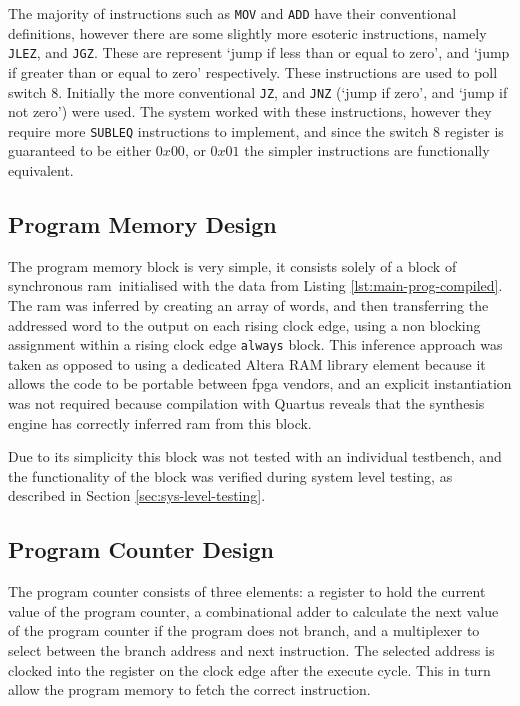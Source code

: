 The majority of instructions such as \texttt{MOV} and \texttt{ADD} have their conventional definitions, however there are some slightly more esoteric instructions, namely \texttt{JLEZ}, and \texttt{JGZ}. These are represent `jump if less than or equal to zero', and `jump if greater than or equal to zero' respectively. These instructions are used to poll switch 8. Initially the more conventional \texttt{JZ}, and \texttt{JNZ} (`jump if zero', and `jump if not zero') were used. The system worked with these instructions, however they require more \texttt{SUBLEQ} instructions to implement, and since the switch 8 register is guaranteed to be either $0x00$, or $0x01$ the simpler instructions are functionally equivalent.

\subsection{Program Memory Design}
The program memory block is very simple, it consists solely of a block of synchronous \gls{ram}\, initialised with the data from Listing \ref{lst:main-prog-compiled}. The \gls{ram} was inferred by creating an array of words, and then transferring the addressed word to the output on each rising clock edge, using a non blocking assignment within a rising clock edge \texttt{always} block. This inference approach was taken as opposed to using a dedicated Altera RAM library element because it allows the code to be portable between \gls{fpga} vendors, and an explicit instantiation was not required because compilation with Quartus reveals that the synthesis engine has correctly inferred \gls{ram} from this block.

Due to its simplicity this block was not tested with an individual testbench, and the functionality of the block was verified during system level testing, as described in Section \ref{sec:sys-level-testing}.

\subsection{Program Counter Design}
The program counter consists of three elements: a register to hold the current value of the program counter, a combinational adder to calculate the next value of the program counter if the program does not branch, and a multiplexer to select between the branch address and next instruction. The selected address is clocked into the register on the clock edge after the execute cycle. This in turn allow the program memory to fetch the correct instruction.

